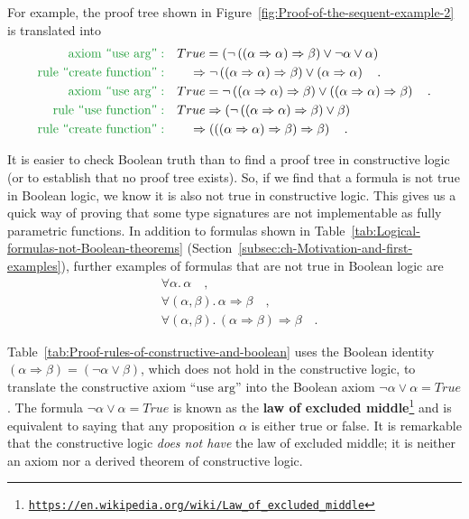 For example, the proof tree shown in Figure~\ref{fig:Proof-of-the-sequent-example-2}
is translated into
\begin{align*}
{\color{greenunder}\text{axiom \textsf{``}use arg\textsf{''}}:}\quad & True=\left(\neg\left(\left(\alpha\Rightarrow\alpha\right)\Rightarrow\beta\right)\vee\neg\alpha\vee\alpha\right)\\
{\color{greenunder}\text{rule \textsf{``}create function\textsf{''}}:}\quad & \quad\Rightarrow\neg\left(\left(\alpha\Rightarrow\alpha\right)\Rightarrow\beta\right)\vee\left(\alpha\Rightarrow\alpha\right)\quad.\\
{\color{greenunder}\text{axiom \textsf{``}use arg\textsf{''}}:}\quad & True=\neg\left(\left(\alpha\Rightarrow\alpha\right)\Rightarrow\beta\right)\vee\left(\left(\alpha\Rightarrow\alpha\right)\Rightarrow\beta\right)\quad.\\
{\color{greenunder}\text{rule \textsf{``}use function\textsf{''}}:}\quad & True\Rightarrow\left(\neg\left(\left(\alpha\Rightarrow\alpha\right)\Rightarrow\beta\right)\vee\beta\right)\\
{\color{greenunder}\text{rule \textsf{``}create function\textsf{''}}:}\quad & \quad\Rightarrow\left(\left(\left(\alpha\Rightarrow\alpha\right)\Rightarrow\beta\right)\Rightarrow\beta\right)\quad.
\end{align*}

It is easier to check Boolean truth than to find a proof tree in constructive
logic (or to establish that no proof tree exists). So, if we find
that a formula is not true in Boolean logic, we know it is also not
true in constructive logic. This gives us a quick way of proving that
some type signatures are not implementable as fully parametric functions.
In addition to formulas shown in Table~\ref{tab:Logical-formulas-not-Boolean-theorems}
(Section~\ref{subsec:ch-Motivation-and-first-examples}), further
examples of formulas that are not true in Boolean logic are
\begin{align*}
 & \forall\alpha.\,\alpha\quad,\\
 & \forall(\alpha,\beta).\,\alpha\Rightarrow\beta\quad,\\
 & \forall(\alpha,\beta).\,(\alpha\Rightarrow\beta)\Rightarrow\beta\quad.
\end{align*}

Table~\ref{tab:Proof-rules-of-constructive-and-boolean} uses the
Boolean identity $\left(\alpha\Rightarrow\beta\right)=(\neg\alpha\vee\beta)$,
which does not hold in the constructive logic, to translate the constructive
axiom \textsf{``}$\text{use arg}$\textsf{''} into the Boolean axiom $\neg\alpha\vee\alpha=True$.
The formula $\neg\alpha\vee\alpha=True$ is known as the \textbf{law
of excluded middle}\footnote{\texttt{\href{https://en.wikipedia.org/wiki/Law_of_excluded_middle}{https://en.wikipedia.org/wiki/Law\_of\_excluded\_middle}}}
and is equivalent to saying that any proposition $\alpha$ is either
true or false. It is remarkable that the constructive logic \emph{does
not have} the law of excluded middle; it is neither an axiom nor a
derived theorem of constructive logic. 

